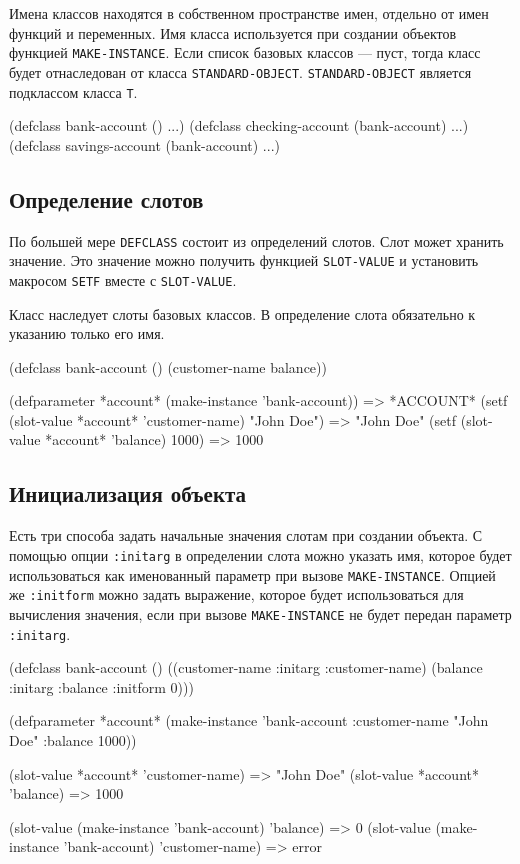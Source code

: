 Имена классов находятся в собственном пространстве имен, отдельно от имен функций и переменных. Имя класса используется при создании объектов функцией \lstinline{MAKE-INSTANCE}. Если список базовых классов — пуст, тогда класс будет отнаследован от класса \lstinline{STANDARD-OBJECT}. \lstinline{STANDARD-OBJECT} является подклассом класса \lstinline{T}.
\begin{cllst}{}{}
(defclass bank-account () ...)
(defclass checking-account (bank-account) ...)
(defclass savings-account (bank-account) ...)
\end{cllst}

\subsection{Определение слотов}
По большей мере \lstinline{DEFCLASS} состоит из определений слотов. Слот может хранить значение. Это значение можно получить функцией \lstinline{SLOT-VALUE} и установить макросом \lstinline{SETF} вместе с \lstinline{SLOT-VALUE}.

Класс наследует слоты базовых классов. В определение слота обязательно к указанию только его имя.
\begin{cllst}{}{}
(defclass bank-account ()
  (customer-name
   balance))

(defparameter *account* (make-instance 'bank-account))  => *ACCOUNT*
(setf (slot-value *account* 'customer-name) "John Doe") => "John Doe"
(setf (slot-value *account* 'balance) 1000)             => 1000
\end{cllst}

\subsection{Инициализация объекта}
Есть три способа задать начальные значения слотам при создании объекта. С помощью опции \lstinline{:initarg} в определении слота можно указать имя, которое будет использоваться как именованный параметр при вызове \lstinline{MAKE-INSTANCE}. Опцией же \lstinline{:initform} можно задать выражение, которое будет использоваться для вычисления значения, если при вызове \lstinline{MAKE-INSTANCE} не будет передан параметр \lstinline{:initarg}.
\begin{cllst}{}{}
(defclass bank-account ()
  ((customer-name
    :initarg :customer-name)
   (balance
    :initarg :balance
    :initform 0)))

(defparameter *account*
  (make-instance 'bank-account :customer-name "John Doe" :balance 1000))

(slot-value *account* 'customer-name) => "John Doe"
(slot-value *account* 'balance)       => 1000

(slot-value (make-instance 'bank-account) 'balance)       => 0
(slot-value (make-instance 'bank-account) 'customer-name) => error
\end{cllst}


